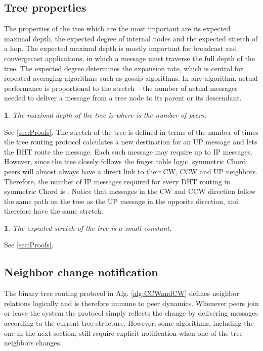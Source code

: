 \documentclass[12pt,english,journal]{elsarticle}
\makeatletter
\numberwithin{equation}{section}
\numberwithin{figure}{section}
\theoremstyle{plain}
\theoremstyle{plain}
\newtheorem{lem}[thm]{\protect\lemmaname}
\newenvironment{proof}[1][\protect\proofname]{\par
\normalfont\topsep6\p@\@plus6\p@\relax
\trivlist
\itemindent\parindent
\item[\hskip\labelsep
\scshape
#1]\ignorespaces
}{\endtrivlist\@endpefalse
}
\providecommand{\proofname}{Proof}
\providecommand{\lemmaname}{Lemma}
\makeatother
\begin{document}
\subsection{Tree properties}

The properties of the tree which are the most important are its expected
maximal depth, the expected degree of internal nodes and the expected
stretch of a hop. The expected maximal depth is mostly important for
broadcast and convergecast applications, in which a message must traverse
the full depth of the tree. The expected degree determines the expansion
rate, which is central for repeated averaging algorithms such as gossip
algorithms. In any algorithm, actual performance is proportional to
the stretch -- the number of actual messages needed to deliver a message
from a tree node to its parent or its descendant.
\begin{lem}
The maximal depth of the tree is  where 
is the number of peers.\end{lem}
\begin{proof}
See \ref{sec:Proofs}.
\end{proof}
The stretch of the tree is defined in terms of the number of times
the tree routing protocol calculates a new destination for an UP message
and lets the DHT route the message. Each such message may require
up to  IP messages. However, since the tree closely follows
the finger table logic, symmetric Chord peers will almost always have
a direct link to their CW, CCW and UP neighbors. Therefore, the number
of IP messages required for every DHT routing in symmetric Chord is
. Notice that messages in the CW and CCW direction
follow the same path on the tree as the UP message in the opposite
direction, and therefore have the same stretch. 
\begin{lem}
The expected stretch of the tree is a small constant.\end{lem}
\begin{proof}
See \ref{sec:Proofs}.
\end{proof}

\subsection{\label{sub:Detecting-neighbor-dynamics}Neighbor change notification}

The binary tree routing protocol in Alg. \ref{alg:CCWandCW} defines
neighbor relations logically and is therefore immune to peer dynamics.
Whenever peers join or leave the system the protocol simply reflects
the change by delivering messages according to the current tree structure.
However, some algorithms, including the one in the next section, still
require explicit notification when one of the tree neighbors changes.
\end{document}
